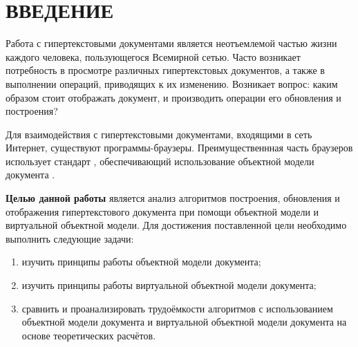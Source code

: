 \section*{ВВЕДЕНИЕ}

Работа с гипертекстовыми документами является неотъемлемой частью жизни каждого человека, пользующегося Всемирной сетью.
Часто возникает потребность в просмотре различных гипертекстовых документов, а также в выполнении операций, приводящих к их изменению.
Возникает вопрос: каким образом стоит отображать документ, и производить операции его обновления и построения?

Для взаимодействия с гипертекстовыми документами, входящими в сеть Интернет, существуют программы-браузеры.
Преимущественнная часть браузеров использует стандарт \cite{dom-doc}, обеспечивающий использование объектной модели документа \cite{dom}. 


\textbf{Целью данной работы} является анализ алгоритмов построения, обновления и отображения гипертекстового документа при помощи объектной модели и виртуальной объектной модели.
Для достижения поставленной цели необходимо выполнить следующие задачи:

\begin{enumerate}[label=\arabic*)]
	\item изучить принципы работы объектной модели документа;
	\item изучить принципы работы виртуальной объектной модели документа;
	\item сравнить и проанализировать трудоёмкости алгоритмов с использованием объектной модели документа и виртуальной объектной модели документа на основе теоретических расчётов.
\end{enumerate}


\pagebreak